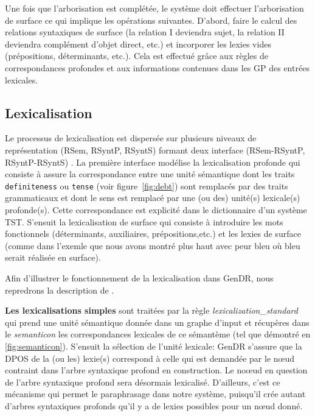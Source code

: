 Une fois que l'arborisation est complétée, le système doit effectuer l'arborisation de surface ce qui implique les opérations suivantes. D'abord, faire le calcul des relations syntaxiques de surface (la relation I deviendra sujet, la relation II deviendra complément d'objet direct, etc.) et incorporer les lexies vides (prépositions, déterminants, etc.). Cela est effectué grâce aux règles de correspondances profondes et aux informations contenues dans les \ac{GP} des entrées lexicales.

\subsection{Lexicalisation}

Le processus de lexicalisation est dispersée sur plusieurs niveaux de représentation (\ac{RSem}, \ac{RSyntP}, \ac{RSyntS}) formant deux interface (\ac{RSem}-\ac{RSyntP}, \ac{RSyntP}-\ac{RSyntS}) \citep{PolguerePourmodelestratifie}. La première interface modélise la lexicalisation profonde qui consiste à assure la correspondance entre une unité sémantique dont les traits \texttt{definiteness} ou \texttt{tense} (voir figure~\ref{fig:debt}) sont remplacés par des traits grammaticaux et dont le sens est remplacé par une (ou des) unité(s) lexicale(s) profonde(s). Cette correspondance est explicité dans le dictionnaire d'un système \ac{TST}. S'ensuit la lexicalisation de surface qui consiste à introduire les mots fonctionnels (déterminants, auxiliaires, prépositions,etc.) et les lexies de surface (comme dans l'exemle que nous avons montré plus haut avec peur bleu où bleu serait réalisée en surface). 

Afin d'illustrer le fonctionnement de la lexicalisation dans GenDR, nous repredrons la description de \cite{lareau18}.

\textbf{Les lexicalisations simples}
sont traitées par la règle \emph{lexicalization\_standard} qui prend une unité sémantique donnée dans un graphe d'input et récupères dans le \emph{semanticon} les correspondances lexicales de ce sémantème (tel que démontré en \ref{fig:semanticon}). S'ensuit la sélection de l'unité lexicale: GenDR s'assure que la \ac{DPOS} de la (ou les) lexie(s) correspond à celle qui est demandée par le n\oe{}ud contraint dans l'arbre syntaxique profond en construction. Le no\oe{}ud en question de l'arbre syntaxique profond sera désormais lexicalisé. D'ailleurs, c'est ce mécanisme qui permet le paraphrasage dans notre système, puisqu'il crée autant d'arbres syntaxiques profonds qu'il y a de lexies possibles pour un n\oe{}ud donné.

